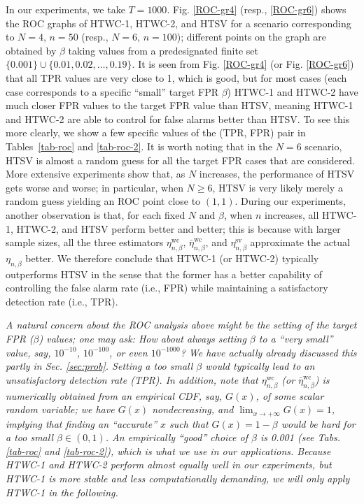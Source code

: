 \documentclass[10pt, twocolumn]{IEEEtran}
\begin{document}
{In our experiments, we take $T = 1000$. Fig. \ref{ROC-gr4} (resp.,
  \ref{ROC-gr6}) shows the ROC graphs of HTWC-1, HTWC-2, and HTSV for a
  scenario corresponding to $N = 4,\, n = 50$ (resp., $N = 6,\, n =
  100$); different points on the graph are obtained by $\beta$ taking
  values from a predesignated finite set $\{0.001\} \cup \{0.01, 0.02,
  \ldots, 0.19\}$.  It is seen from Fig. \ref{ROC-gr4} (or
  Fig. \ref{ROC-gr6}) that all TPR values are very close to 1, which is
  good, but for most cases (each case corresponds to a specific
  ``small'' target FPR $\beta$) HTWC-1 and HTWC-2 have much closer FPR
  values to the target FPR value than HTSV, meaning HTWC-1 and HTWC-2
  are able to control for false alarms better than HTSV. To see this
  more clearly, we show a few specific values of the (TPR, FPR) pair in
  Tables~\ref{tab-roc} and \ref{tab-roc-2}. It is worth noting that in the $N = 6$
  scenario, HTSV is almost a random guess for all the target FPR cases
  that are considered.  More extensive experiments show that, as $N$
  increases, the performance of HTSV gets worse and worse; in
  particular, when $N \ge 6$, HTSV is very likely merely a random guess
  yielding an ROC point close to $(1,1)$. During our experiments,
  another observation is that, for each fixed $N$ and $\beta$, when $n$
  increases, all HTWC-1, HTWC-2, and HTSV perform better and better;
  this is because with larger sample sizes, all the three estimators
  $\eta_{n,\beta}^{\text{wc}}$, $\bar \eta_{n,\beta}^{\text{wc}}$, and
  $\eta_{n,\beta}^{\text{sv}}$ approximate the actual $\eta_{n,\beta}$
  better. We therefore conclude that HTWC-1 (or HTWC-2) typically
  outperforms HTSV in the sense that the former has a better capability
  of controlling the false alarm rate (i.e., FPR) while maintaining a
  satisfactory detection rate (i.e., TPR).}

{
  \begin{rem} \label{remark-roc} \emph{A natural concern about the ROC
      analysis above might be the setting of the target FPR ($\beta$)
      values; one may ask: How about always setting $\beta$ to a ``very
      small'' value, say, $10^{-10}$, $10^{-100}$, or even $10^{-1000}$?
      We have actually already discussed this partly in
      Sec. \ref{sec:prob}. Setting a too small $\beta$ would typically
      lead to an unsatisfactory detection rate (TPR). In addition, note
      that $\eta_{n,\beta}^{\text{wc}}$ (or $\bar
      \eta_{n,\beta}^{\text{wc}}$) is numerically obtained from an
      empirical CDF, say, $G(x)$, of some scalar random variable; we
      have $G(x)$ nondecreasing, and $\mathop {\lim }\nolimits_{x \to +
        \infty } G\left( x \right) = 1$, implying that finding an
      ``accurate'' $x$ such that $G(x) = 1 - \beta$ would be hard for a
      too small $\beta \in (0 ,1)$. An empirically ``good'' choice of
      $\beta$ is 0.001 (see Tabs. \ref{tab-roc} and \ref{tab-roc-2}),
      which is what we use in our applications. Because HTWC-1 and
      HTWC-2 perform almost equally well in our experiments, but HTWC-1
      is more stable and less computationally demanding, we will
      only apply HTWC-1 in the following.}
\end{rem}}
\end{document}
